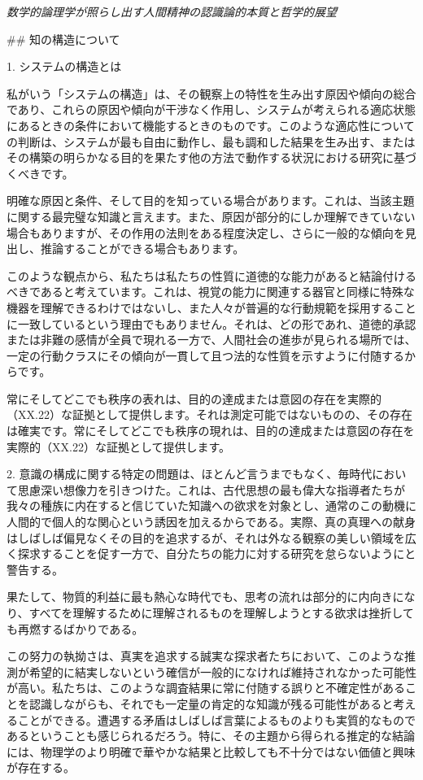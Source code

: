 \documentclass[a4paper,11pt,openany]{ltjsbook}
\begin{document}
\begin{center}
\large\textit{数学的論理学が照らし出す人間精神の認識論的本質と哲学的展望}
\end{center}
\vspace{4mm}

\#\# 知の構造について

1. システムの構造とは

私がいう「システムの構造」は、その観察上の特性を生み出す原因や傾向の総合であり、これらの原因や傾向が干渉なく作用し、システムが考えられる適応状態にあるときの条件において機能するときのものです。このような適応性についての判断は、システムが最も自由に動作し、最も調和した結果を生み出す、またはその構築の明らかなる目的を果たす他の方法で動作する状況における研究に基づくべきです。

明確な原因と条件、そして目的を知っている場合があります。これは、当該主題に関する最完璧な知識と言えます。また、原因が部分的にしか理解できていない場合もありますが、その作用の法則をある程度決定し、さらに一般的な傾向を見出し、推論することができる場合もあります。

このような観点から、私たちは私たちの性質に道徳的な能力があると結論付けるべきであると考えています。これは、視覚の能力に関連する器官と同様に特殊な機器を理解できるわけではないし、また人々が普遍的な行動規範を採用することに一致しているという理由でもありません。それは、どの形であれ、道徳的承認または非難の感情が全員で現れる一方で、人間社会の進歩が見られる場所では、一定の行動クラスにその傾向が一貫して且つ法的な性質を示すように付随するからです。

常にそしてどこでも秩序の表れは、目的の達成または意図の存在を実際的（XX.22）な証拠として提供します。それは測定可能ではないものの、その存在は確実です。常にそしてどこでも秩序の現れは、目的の達成または意図の存在を実際的（XX.22）な証拠として提供します。

2. 意識の構成に関する特定の問題は、ほとんど言うまでもなく、毎時代において思慮深い想像力を引きつけた。これは、古代思想の最も偉大な指導者たちが我々の種族に内在すると信じていた知識への欲求を対象とし、通常のこの動機に人間的で個人的な関心という誘因を加えるからである。実際、真の真理への献身はしばしば偏見なくその目的を追求するが、それは外なる観察の美しい領域を広く探求することを促す一方で、自分たちの能力に対する研究を怠らないようにと警告する。

果たして、物質的利益に最も熱心な時代でも、思考の流れは部分的に内向きになり、すべてを理解するために理解されるものを理解しようとする欲求は挫折しても再燃するばかりである。

この努力の執拗さは、真実を追求する誠実な探求者たちにおいて、このような推測が希望的に結実しないという確信が一般的になければ維持されなかった可能性が高い。私たちは、このような調査結果に常に付随する誤りと不確定性があることを認識しながらも、それでも一定量の肯定的な知識が残る可能性があると考えることができる。遭遇する矛盾はしばしば言葉によるものよりも実質的なものであるということも感じられるだろう。特に、その主題から得られる推定的な結論には、物理学のより明確で華やかな結果と比較しても不十分ではない価値と興味が存在する。
\end{document}
